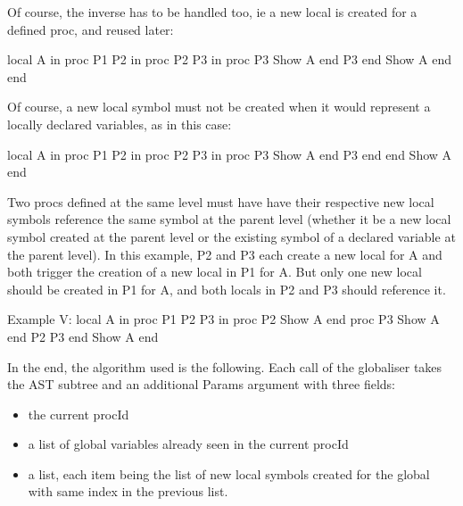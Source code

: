 \documentclass[draft,a4paper]{memoir}
\begin{document}
Of course, the inverse has to be handled too, ie a new local is created for a defined proc, and reused later:

local
   A
in
   proc {P1}
      P2
   in
      proc {P2}
         P3
      in
         proc {P3}
            {Show A}
         end
         {P3}
      end
      {Show A}  %
   end
end


Of course, a new local symbol must not be created when it would represent a locally declared variables, as in this case:

local
   A
in
   proc {P1}
      P2
   in
      proc {P2}
         P3
      in
         proc {P3}
            {Show A}
         end
         {P3}
      end
   end
   {Show A}  %
end

Two procs defined at the same level must have have their respective new local symbols reference the same symbol at the parent level (whether it be a new local symbol created at the parent level or the existing symbol of a declared variable at the parent level). In this example, P2 and P3 each create a new local for A and both trigger the creation of a new local in P1 for A. But only one new local should be created in P1 for A, and both locals in P2 and P3 should reference it.


Example V:
local
   A
in
   proc {P1}
      P2 P3
   in
      proc {P2}
         {Show A}
      end
      proc {P3}
          {Show A}
      end
      {P2}
      {P3}
   end
   {Show A}  %
end

In the end, the algorithm used is the following.
Each call of the globaliser takes the AST subtree and an additional Params argument with three fields:
\begin{itemize}
   \item the current procId
   \item a list of global variables already seen in the current procId
   \item a list, each item being the list of new local symbols created for the global with same index in the previous list.
\end{itemize}
\end{document}
